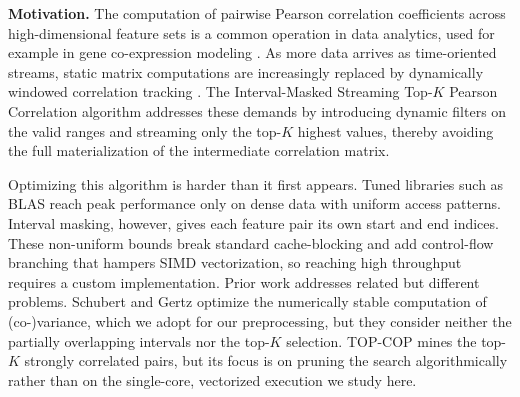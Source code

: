 \documentclass[letterpaper]{article}
\newcommand{\mypar}[1]{{\bf #1.}}
\begin{document}


\mypar{Motivation}
The computation of pairwise Pearson correlation coefficients \cite{pearson1895regression} across high-dimensional feature sets is a common operation in data analytics, used for example in gene co-expression modeling \cite{langfelder2008wgcna}.
As more data arrives as time-oriented streams, static matrix computations are increasingly replaced by dynamically windowed correlation tracking \cite{papadimitriou2006local}.
The Interval-Masked Streaming Top-$K$ Pearson Correlation algorithm addresses these demands by introducing dynamic filters on the valid ranges and streaming only the top-$K$ highest values, thereby avoiding the full materialization of the intermediate correlation matrix.

Optimizing this algorithm is harder than it first appears.
Tuned libraries such as BLAS reach peak performance only on dense data with uniform access patterns.
Interval masking, however, gives each feature pair its own start and end indices.
These non-uniform bounds break standard cache-blocking and add control-flow branching that hampers SIMD vectorization, so reaching high throughput requires a custom implementation.
Prior work addresses related but different problems. Schubert and Gertz \cite{schubert2018numerically} optimize the numerically stable computation of (co-)variance, which we adopt for our preprocessing, but they consider neither the partially overlapping intervals nor the top-$K$ selection. TOP-COP \cite{xiong2006topcop} mines the top-$K$ strongly correlated pairs, but its focus is on pruning the search algorithmically rather than on the single-core, vectorized execution we study here.

\end{document}
